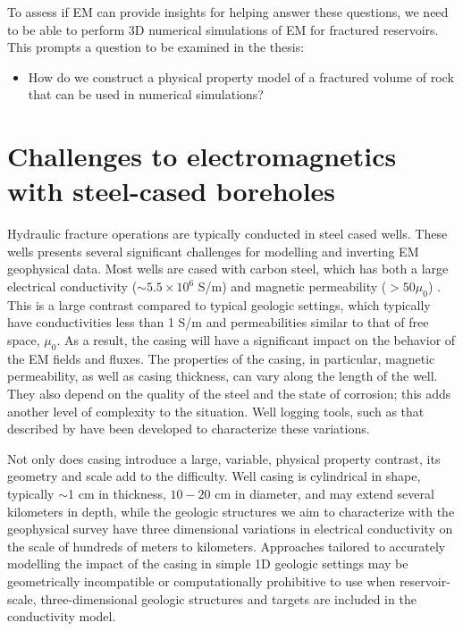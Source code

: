 To assess if EM can provide insights for helping answer these questions, we need to be able to perform 3D numerical simulations of EM for fractured reservoirs. This prompts a question to be examined in the thesis:
\begin{itemize}
\item{How do we construct a physical property model of a fractured volume of rock that can be used in numerical simulations?}
\end{itemize}

\section{Challenges to electromagnetics with steel-cased boreholes}
\label{sec:challenges-steel-casing}

Hydraulic fracture operations are typically conducted in steel cased wells. These wells presents several significant challenges for modelling and inverting EM geophysical data. Most wells are cased with carbon steel, which has both a large electrical conductivity ($\sim 5.5\times 10^6$ S/m) and magnetic permeability ($> 50 \mu_0$) \citep{wuhabashy1994}. This is a large contrast compared to  typical geologic settings, which typically have conductivities less than 1 S/m and permeabilities similar to that of free space, $\mu_0$. As a result, the casing will have a significant impact on the behavior of the EM fields and fluxes. The properties of the casing, in particular, magnetic permeability, as well as casing thickness, can vary along the length of the well. They also  depend on the quality of the steel and the state of corrosion; this adds another level of complexity to the situation. Well logging tools, such as that described by \cite{brill2012} have been developed to characterize these variations.

Not only does casing introduce a large, variable, physical property contrast, its geometry and scale add to the difficulty. Well casing is cylindrical in shape, typically $\sim$1 cm in thickness, $10-20$ cm in diameter, and may extend several kilometers in depth, while the geologic structures we aim to characterize with the geophysical survey have three dimensional variations in electrical conductivity on the scale of hundreds of meters to kilometers. Approaches tailored to accurately modelling the impact of the casing in simple 1D geologic settings may be geometrically incompatible or computationally prohibitive to use when reservoir-scale, three-dimensional geologic structures and targets are included in the conductivity model.

